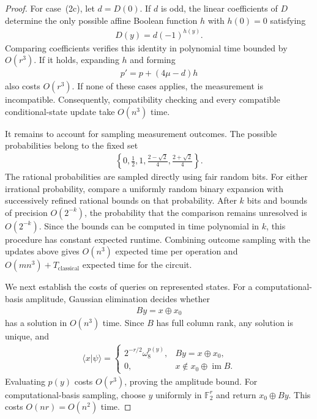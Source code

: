 \begin{proof}
For case~(2c), let $d=D(0)$.
If $d$ is odd, the linear coefficients of $D$ determine the only possible affine Boolean function $h$ with $h(0)=0$ satisfying
\begin{align}
    D(y)=d(-1)^{h(y)}.
\end{align}
Comparing coefficients verifies this identity in polynomial time bounded by $O(r^3)$.
If it holds, expanding $h$ and forming
\begin{align}
    p'=p+(4\mu-d)h
\end{align}
also costs $O(r^3)$.
If none of these cases applies, the measurement is incompatible.
Consequently, compatibility checking and every compatible conditional-state update take $O(n^3)$ time.

It remains to account for sampling measurement outcomes.
The possible probabilities belong to the fixed set
\begin{align}
    \left\{0,\frac12,1,\frac{2-\sqrt2}{4},
    \frac{2+\sqrt2}{4}\right\}.
\end{align}
The rational probabilities are sampled directly using fair random bits.
For either irrational probability, compare a uniformly random binary expansion with successively refined rational bounds on that probability.
After $k$ bits and bounds of precision $O(2^{-k})$, the probability that the comparison remains unresolved is $O(2^{-k})$.
Since the bounds can be computed in time polynomial in $k$, this procedure has constant expected runtime.
Combining outcome sampling with the updates above gives $O(n^3)$ expected time per operation and $O(mn^3)+T_{\mathrm{classical}}$ expected time for the circuit.

We next establish the costs of queries on represented states.
For a computational-basis amplitude, Gaussian elimination decides whether
\begin{align}
    By=x\oplus x_0
\end{align}
has a solution in $O(n^3)$ time.
Since $B$ has full column rank, any solution is unique, and
\begin{align}
    \langle x|\psi\rangle
    =
    \begin{cases}
        2^{-r/2}\omega_8^{p(y)}, & By=x\oplus x_0,\\
        0, & x\notin x_0\oplus\operatorname{im}B.
    \end{cases}
\end{align}
Evaluating $p(y)$ costs $O(r^3)$, proving the amplitude bound.
For computational-basis sampling, choose $y$ uniformly in $\mathbb{F}_2^r$ and return $x_0\oplus By$.
This costs $O(nr)=O(n^2)$ time.


\end{proof}
